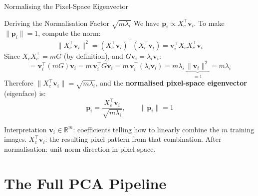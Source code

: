 \documentclass{beamer}
\begin{document}
\begin{frame}[shrink=10]{Normalising the Pixel-Space Eigenvector}
  \begin{block}{Deriving the Normalisation Factor $\sqrt{m\lambda_i}$}
    We have $\mathbf{p}_i \propto X_c^\top\mathbf{v}_i$.
    To make $\|\mathbf{p}_i\| = 1$, compute the norm:
    \[
      \|X_c^\top\mathbf{v}_i\|^2
        = (X_c^\top\mathbf{v}_i)^\top(X_c^\top\mathbf{v}_i)
        = \mathbf{v}_i^\top X_c X_c^\top \mathbf{v}_i
    \]
    Since $X_c X_c^\top = mG$ (by definition), and
    $G\mathbf{v}_i = \lambda_i\mathbf{v}_i$:
    \[
      = \mathbf{v}_i^\top (mG)\mathbf{v}_i
        = m\,\mathbf{v}_i^\top G\mathbf{v}_i
        = m\,\mathbf{v}_i^\top (\lambda_i\mathbf{v}_i)
        = m\lambda_i\,\underbrace{\|\mathbf{v}_i\|^2}_{=1}
        = m\lambda_i
    \]
    Therefore $\|X_c^\top\mathbf{v}_i\| = \sqrt{m\lambda_i}$, and
    the \textbf{normalised pixel-space eigenvector} (eigenface) is:
    \[
      \boxed{
        \mathbf{p}_i
          = \frac{X_c^\top\mathbf{v}_i}{\sqrt{m\lambda_i}}
      },
      \qquad
      \|\mathbf{p}_i\| = 1
    \]
  \end{block}

  \begin{exampleblock}{Interpretation}
    $\mathbf{v}_i \in \mathbb{R}^m$: coefficients telling how to
    linearly combine the $m$ training images.
    $X_c^\top\mathbf{v}_i$: the resulting pixel pattern from that
    combination.
    After normalisation: unit-norm direction in pixel space.
  \end{exampleblock}
\end{frame}

\section{The Full PCA Pipeline}
\end{document}
